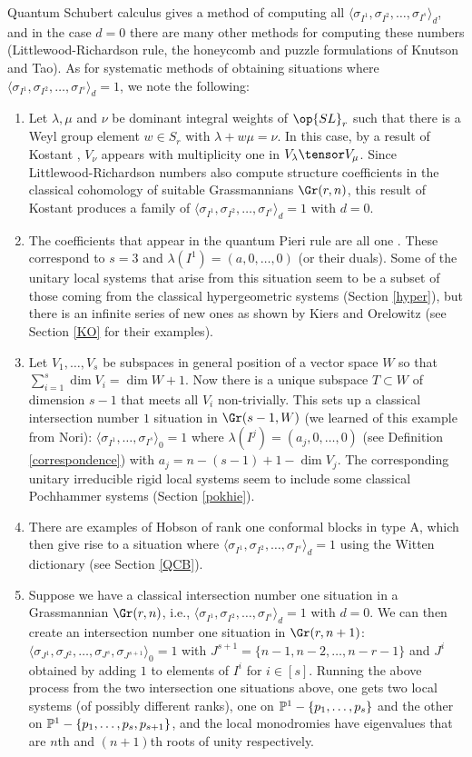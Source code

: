  Quantum Schubert calculus gives a method of computing all $\langle\sigma_{I^1}, \sigma_{I^2},\dots,\sigma_{I^s}\rangle_d$, and in the case $d=0$ there are many other methods for computing these numbers (Littlewood-Richardson rule, the honeycomb and puzzle formulations of Knutson and Tao). As for systematic methods of obtaining situations where $\langle\sigma_{I^1}, \sigma_{I^2},\dots,\sigma_{I^s}\rangle_d= 1$, we note the following:
\begin{enumerate}
\item Let $\lambda,\mu$ and $\nu$ be dominant integral weights of $\op{SL}_r$ such that there is a Weyl group  element $w\in S_r$ with $\lambda+w\mu=\nu$. In this case, by a result of Kostant \cite[Lemma 4.1]{Kostant}, $V_{\nu}$ appears with multiplicity one in $V_{\lambda}\tensor V_{\mu}$. Since Littlewood-Richardson numbers also compute structure coefficients in the classical cohomology of suitable Grassmannians $\Gr(r,n)$, this result of Kostant produces a family of $\langle\sigma_{I^1}, \sigma_{I^2},\dots,\sigma_{I^s}\rangle_d=1$ with $d=0$.
\item The coefficients that appear in the quantum Pieri rule are all one \cite{bertie}. These correspond to $s=3$ and $\lambda(I^1)=(a,0,\dots,0)$ (or their duals). Some of the unitary local systems that arise from this situation seem to be a subset of  those coming from the classical  hypergeometric systems (Section \ref{hyper}), but there is an infinite series of new ones  as shown by Kiers and Orelowitz (see Section \ref{KO} for their examples).
\item Let $V_1,\dots,V_s$ be  subspaces in general position of a vector space $W$ so that $\sum_{i=1}^s \dim V_i= \dim W+1$. Now there is a unique subspace $T\subset W$ of dimension $s-1$ that meets all $V_i$ non-trivially.
This sets up a classical intersection number $1$ situation in $\Gr(s-1,W)$ (we learned of this example from Nori): $\langle\sigma_{I^1},\dots,\sigma_{I^s}\rangle_0=1$ where $\lambda(I^j)=(a_j,0,\dots,0)$ (see Definition  \ref{correspondence}) with $a_j = n-(s-1) +1-\dim V_j$. The corresponding unitary irreducible rigid local systems seem to include some classical Pochhammer systems (Section \ref{pokhie}).
\item There are examples of Hobson \cite{Hobson} of rank one conformal blocks in type A, which then give rise
to a situation where $\langle\sigma_{I^1}, \sigma_{I^2},\dots,\sigma_{I^s}\rangle_d= 1$ using the Witten dictionary (see Section \ref{QCB}).
\item Suppose we have a classical intersection number one   situation in a Grassmannian $\Gr(r,n)$, i.e., $\langle\sigma_{I^1}, \sigma_{I^2},\dots,\sigma_{I^s}\rangle_d= 1$ with $d=0$. We can then create an intersection number one situation in $\Gr(r,n+1)$:   $\langle\sigma_{J^1}, \sigma_{J^2},\dots,\sigma_{J^s},\sigma_{J^{s+1}}\rangle_0= 1$ with $J^{s+1}=\{n-1,n-2,\dots,n-r-1\}$ and $J^i$ obtained by adding $1$ to elements of $I^i$ for $i\in[s]$.  Running the above process from the two intersection one situations above, one gets two local systems (of possibly different ranks), one on $\Bbb{P}^1-\{p_1,\dots,p_s\}$ and the other on $\Bbb{P}^1-\{p_1,\dots,p_s,p_{s+1}\}$, and the local monodromies have eigenvalues that are $n$th and $(n+1)$th roots of unity respectively.

\end{enumerate}
